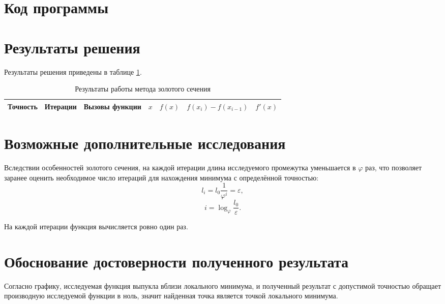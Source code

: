 \documentclass[10pt,a4paper,titlepage]{article}
\begin{document}
\section{Код программы}
\lstset{language=Octave, caption=Решение задачи поиска минимума унимодальной функции,%
label=main-source-code, basicstyle=\footnotesize,%
numbers=left, numberstyle=\footnotesize, numbersep=5pt, frame=single, breaklines=true, breakatwhitespace=false,%
inputencoding=utf8x}


\section{Результаты решения}
Результаты решения приведены в таблице \ref{result-table}.

\begin{table}[H]
\caption{Результаты работы метода золотого сечения}
\label{result-table}
\begin{center}
\begin{tabular}{|c|c|c|c|c|c|c|}
\hline
Точность & Итерации & Вызовы функции & $x$ & $f(x)$ & $f(x_i) - f(x_{i-1})$ & $f'(x)$ \\
\hline

\hline
\end{tabular}
\end{center}
\end{table}


\section{Возможные дополнительные исследования}
Вследствии особенностей золотого сечения, на каждой итерации длина исследуемого промежутка уменьшается в $\varphi$ раз, 
что позволяет заранее оценить необходимое число итераций для нахождения минимума с определённой точностью:
$$
  l_i = l_0 \frac{1}{\varphi^i} = \varepsilon,
$$
$$
   i = \log_{\varphi} \frac{l_0}{\varepsilon}.
$$

На каждой итерации функция вычисляется ровно один раз.

\section{Обоснование достоверности полученного результата}
Согласно графику, исследуемая функция выпукла вблизи локального минимума, 
и полученный результат с допустимой точностью обращает производную исследуемой функции в ноль, 
значит найденная точка является точкой локального минимума.
\end{document}
